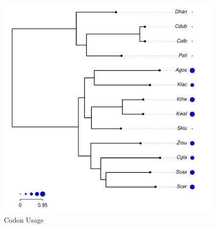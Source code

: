 \documentclass[12pt]{article}
\begin{document}
\begin{figure}[H]
     \centering
	\includegraphics[width=\textwidth]{img/synteny_coverage.pdf}
	\caption{Codon Usage}
	\label{fig:synteny_species}
\end{figure}
\end{document}
